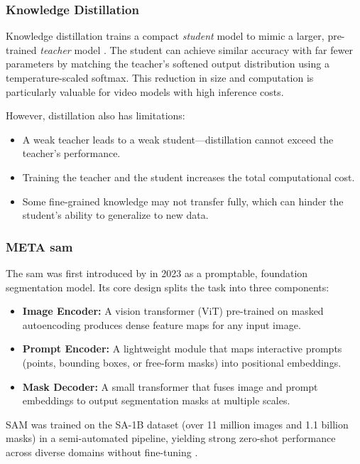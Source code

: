 \subsubsection{Knowledge Distillation}
\label{sssec:knowledge_distillation}

Knowledge distillation trains a compact \emph{student} model to mimic a larger, pre-trained \emph{teacher} model \cite{denize_comedian_2024, li_videomamba_2024, bose_soccerkdnet_2023}. The student can achieve similar accuracy with far fewer parameters by matching the teacher's softened output distribution using a temperature-scaled softmax. This reduction in size and computation is particularly valuable for video models with high inference costs.

However, distillation also has limitations:
\begin{itemize}
    \item A weak teacher leads to a weak student—distillation cannot exceed the teacher's performance.
    \item Training the teacher and the student increases the total computational cost.
    \item Some fine-grained knowledge may not transfer fully, which can hinder the student's ability to generalize to new data.
\end{itemize}

\subsubsection{META \acrlong{sam}}
\label{ssec:meta_sam2}
The \acrfull{sam} was first introduced by \textcite{kirillov_segment_2023} in 2023 as a promptable, foundation segmentation model. Its core design splits the task into three components:
\begin{itemize}
    \item \textbf{Image Encoder:} A vision transformer (ViT) pre-trained on masked autoencoding produces dense feature maps for any input image.
    \item \textbf{Prompt Encoder:} A lightweight module that maps interactive prompts (points, bounding boxes, or free-form masks) into positional embeddings.
    \item \textbf{Mask Decoder:} A small transformer that fuses image and prompt embeddings to output segmentation masks at multiple scales.
\end{itemize}
SAM was trained on the SA-1B dataset (over 11 million images and 1.1 billion masks) in a semi-automated pipeline, yielding strong zero-shot performance across diverse domains without fine-tuning \cite{ravi_sam_nodate}.

